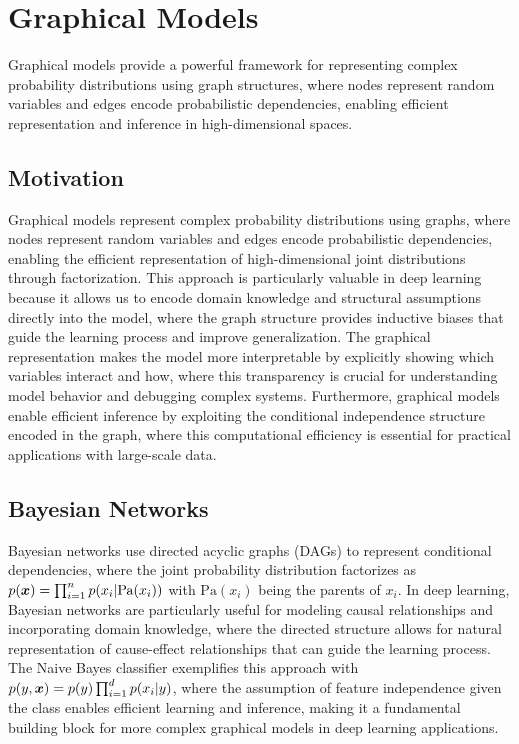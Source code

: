 
\section{Graphical Models }
\label{sec:graphical-models}

Graphical models provide a powerful framework for representing complex probability distributions using graph structures, where nodes represent random variables and edges encode probabilistic dependencies, enabling efficient representation and inference in high-dimensional spaces.

\subsection{Motivation}

Graphical models represent complex probability distributions using graphs, where nodes represent random variables and edges encode probabilistic dependencies, enabling the efficient representation of high-dimensional joint distributions through factorization. This approach is particularly valuable in deep learning because it allows us to encode domain knowledge and structural assumptions directly into the model, where the graph structure provides inductive biases that guide the learning process and improve generalization. The graphical representation makes the model more interpretable by explicitly showing which variables interact and how, where this transparency is crucial for understanding model behavior and debugging complex systems. Furthermore, graphical models enable efficient inference by exploiting the conditional independence structure encoded in the graph, where this computational efficiency is essential for practical applications with large-scale data.

\subsection{Bayesian Networks}

Bayesian networks use directed acyclic graphs (DAGs) to represent conditional dependencies, where the joint probability distribution factorizes as $p(\boldsymbol{x}) = \prod_{i=1}^{n} p(x_i | \text{Pa}(x_i))$ with $\text{Pa}(x_i)$ being the parents of $x_i$. In deep learning, Bayesian networks are particularly useful for modeling causal relationships and incorporating domain knowledge, where the directed structure allows for natural representation of cause-effect relationships that can guide the learning process. The Naive Bayes classifier exemplifies this approach with $p(y, \boldsymbol{x}) = p(y) \prod_{i=1}^{d} p(x_i|y)$, where the assumption of feature independence given the class enables efficient learning and inference, making it a fundamental building block for more complex graphical models in deep learning applications.

